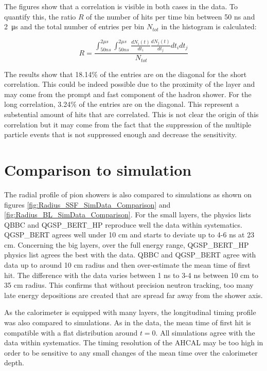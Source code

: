 The figures show that a correlation is visible in both cases in the data. To quantify this, the ratio $R$ of the number of hits per time bin between 50 ns and \SI{2}{\micro\second} and the total number of entries per bin $N_{tot}$ in the histogram is calculated:

\begin{equation}
	R = \frac{\int_{50 ns}^{2 \mu s} \int_{50 ns}^{2 \mu s} \frac{dN_i(t)}{dt_i} \frac{dN_j(t)}{dt_j} dt_i dt_j}{N_{tot}}
\end{equation}

The results show that 18.14\% of the entries are on the diagonal for the short correlation. This could be indeed possible due to the proximity of the layer and may come from the prompt and fast component of the hadron shower. For the long correlation, 3.24\% of the entries are on the diagonal. This represent a substential amount of hits that are correlated. This is not clear the origin of this correlation but it may come from the fact that the suppression of the multiple particle events that is not suppressed enough and decrease the sensitivity.

\section{Comparison to simulation}

The radial profile of pion showers is also compared to simulations as shown on figures \ref{fig:Radius_SSF_SimData_Comparison} and \ref{fig:Radius_BL_SimData_Comparison}. For the small layers, the physics lists QBBC and QGSP\_BERT\_HP reproduce well the data within systematics. QGSP\_BERT agrees well under 10 cm and starts to deviate up to 4-6 ns at 23 cm. Concerning the big layers, over the full energy range, QGSP\_BERT\_HP physics list agrees the best with the data. QBBC and QGSP\_BERT agree with data up to around 10 cm radius and then over-estimate the mean time of first hit. The difference with the data varies between 1 ns to 3-4 ns between 10 cm to 35 cm radius. This confirms that without precision neutron tracking, too many late energy depositions are created that are spread far away from the shower axis.

As the calorimeter is equipped with many layers, the longitudinal timing profile was also compared to simulations. As in the data, the mean time of first hit is compatible with a flat distribution around $t=0$. All simulations agree with the data within systematics. The timing resolution of the AHCAL may be too high in order to be sensitive to any small changes of the mean time over the calorimeter depth.

